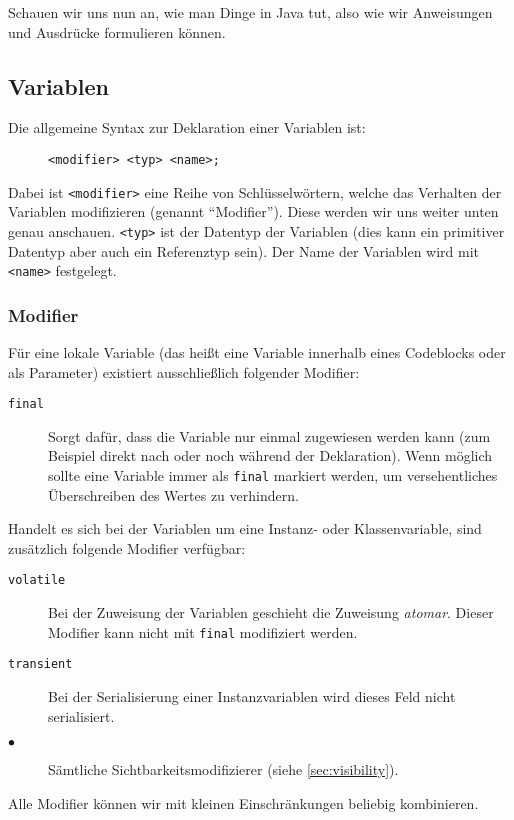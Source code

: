 Schauen wir uns nun an, wie man Dinge in Java tut, also wie wir Anweisungen und Ausdrücke formulieren können.

\subsection{Variablen}
	
	Die allgemeine Syntax zur Deklaration einer Variablen ist:
	\begin{figure}[H]
		\centering
		\lstinline|<modifier> <typ> <name>;|
	\end{figure}
	Dabei ist \texttt{<modifier>} eine Reihe von Schlüsselwörtern, welche das Verhalten der Variablen modifizieren (genannt \enquote{Modifier}). Diese werden wir uns weiter unten genau anschauen. \texttt{<typ>} ist der Datentyp der Variablen (dies kann ein primitiver Datentyp aber auch ein Referenztyp sein). Der Name der Variablen wird mit \texttt{<name>} festgelegt.
	
	\subsubsection{Modifier}
		Für eine lokale Variable (das heißt eine Variable innerhalb eines Codeblocks oder als Parameter) existiert ausschließlich folgender Modifier:
		\begin{description}
			\item[\texttt{final}] Sorgt dafür, dass die Variable nur einmal zugewiesen werden kann (zum Beispiel direkt nach oder noch während der Deklaration). Wenn möglich sollte eine Variable immer als \lstinline|final| markiert werden, um versehentliches Überschreiben des Wertes zu verhindern.
		\end{description}
		Handelt es sich bei der Variablen um eine Instanz- oder Klassenvariable, sind zusätzlich folgende Modifier verfügbar:
		\begin{description}
			\item[\texttt{volatile}] Bei der Zuweisung der Variablen geschieht die Zuweisung \textit{atomar}. Dieser Modifier kann nicht mit \lstinline|final| modifiziert werden.
			\item[\texttt{transient}] Bei der Serialisierung einer Instanzvariablen wird dieses Feld nicht serialisiert.
			\item[\(\bullet\)] Sämtliche Sichtbarkeitsmodifizierer (siehe \ref{sec:visibility}).
		\end{description}
		Alle Modifier können wir mit kleinen Einschränkungen beliebig kombinieren.
		
